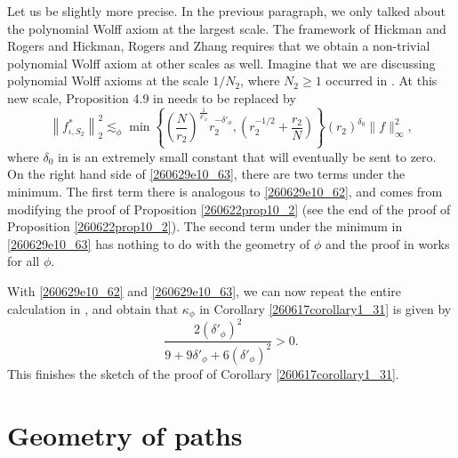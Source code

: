 \documentclass{article}
\numberwithin{equation}{section}
\theoremstyle{plain}
\begin{document}
Let us be slightly more precise. 
In the previous paragraph, we only talked about the polynomial Wolff axiom at the largest scale. The framework of Hickman and Rogers \cite{hickman2019improved} and Hickman, Rogers and Zhang \cite{HRZ22} requires that we obtain a non-trivial polynomial Wolff axiom at other scales as well. Imagine that we are discussing polynomial Wolff axioms at the scale $1/N_2$, where $N_2\ge 1$ occurred in \cite[page 992]{DGGZ24}. At this new scale, Proposition 4.9 in \cite{DGGZ24} needs to be replaced by 
\begin{equation}\label{260629e10_63}
    \left\|f_{\iota, S_2}^*\right\|_2^2 \lesssim_{\phi} \min \left\{\left(\frac{N}{r_2}\right)^{\frac{1}{\delta'_{\phi}}} r_2^{-\delta'_{\phi}},\left(r_2^{-1 / 2}+\frac{r_2}{N}\right)\right\}\left(r_2\right)^{\delta_0}\|f\|_{\infty}^2,
\end{equation}
where $\delta_0$ in \cite[Proposition 4.9]{DGGZ24} is an extremely small constant that will eventually be sent to zero. On the right hand side of \eqref{260629e10_63}, there are two terms under the minimum. The first term there is analogous to \eqref{260629e10_62}, and  comes from modifying the proof of Proposition \ref{260622prop10_2} (see the end of the proof of Proposition \ref{260622prop10_2}). The second term under the minimum in \eqref{260629e10_63}  has nothing to do with the geometry of $\phi$ and the proof in \cite[Proposition 4.9]{DGGZ24} works for all $\phi$. 

With \eqref{260629e10_62} and \eqref{260629e10_63}, we can now repeat the entire calculation in \cite{DGGZ24}, and obtain that $\kappa_{\phi}$ in Corollary \ref{260617corollary1_31} is given by 
\begin{equation}
    \frac{
    2(\delta'_{\phi})^2
    }{
    9+ 9 \delta'_{\phi}+ 6 (\delta'_{\phi})^2
    }>0.
\end{equation}
This finishes the sketch of the proof of Corollary \ref{260617corollary1_31}.













\appendix



\section{Geometry of paths}\label{250711appendix_a}
\end{document}
